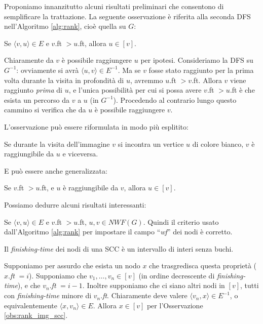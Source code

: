 Proponiamo innanzitutto alcuni risultati preliminari che consentono di semplificare la trattazione. La seguente osservazione è riferita alla seconda DFS nell'Algoritmo \ref{alg:rank}, cioè quella su $G$:
\begin{observation}
    \label{obs:rank_img_scc}
    Se $\langle v,u\rangle \in E$ e $v$.ft $> u$.ft, allora $u \in [v]$.
\end{observation}
\begin{proof2}
    Chiaramente da $v$ è possibile raggiungere $u$ per ipotesi. Consideriamo la DFS su $G^{-1}$: ovviamente si avrà $\langle u, v\rangle \in E^{-1}$. Ma se $v$ fosse stato raggiunto per la prima volta durante la visita in profondità di $u$, avremmo $u$.ft $> v$.ft. Allora $v$ viene raggiunto \emph{prima} di $u$, e l'unica possibilità per cui si possa avere $v$.ft $> u$.ft è che esista un percorso da $v$ a $u$ (in $G^{-1}$). Procedendo al contrario lungo questo cammino si verifica che da $u$ è possibile raggiungere $v$.
\end{proof2}
L'osservazione può essere riformulata in modo più esplitito:
\begin{corollary}
    Se durante la visita dell'immagine $v$ si incontra un vertice $u$ di colore bianco, $v$ è raggiungibile da $u$ e viceversa.
\end{corollary}
E può essere anche generalizzata:
\begin{corollary}
    \label{cor:scc_minore_inglobamento}
    Se $v$.ft $> u$.ft, e $u$ è raggiungibile da $v$, allora $u \in [v]$.
\end{corollary}
Possiamo dedurre alcuni risultati interessanti:
\begin{corollary}
    Se $\langle v,u\rangle \in E$ e $v$.ft $> u$.ft, $u,v \in NWF(G)$. Quindi il criterio usato dall'Algoritmo \ref{alg:rank} per impostare il campo ``\emph{wf}'' dei nodi è corretto.
\end{corollary}
\begin{corollary}
    \label{cor:no_buchi_scc}
    Il \emph{finishing-time} dei nodi di una SCC è un intervallo di interi senza buchi.
\end{corollary}
\begin{proof2}
    Supponiamo per assurdo che esista un nodo $x$ che trasgredisca questa proprietà ($x$.\emph{ft} $= i$). Supponiamo che $v_1, \dots, v_n \in [v]$ (in ordine decrescente di \emph{finishing-time}), e che $v_n$.\emph{ft} $= i-1$. Inoltre supponiamo che ci siano altri nodi in $[v]$, tutti con \emph{finishing-time} minore di $v_n$.\emph{ft}. Chiaramente deve valere $\langle v_n,x \rangle \in E^{-1}$, o equivalentemente $\langle x,v_n \rangle \in E$. Allora $x \in [v]$ per l'Osservazione \ref{obs:rank_img_scc}.
\end{proof2}
